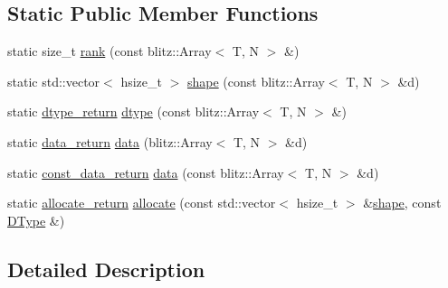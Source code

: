 \subsection*{Static Public Member Functions}
\begin{DoxyCompactItemize}
\item 
static size\-\_\-t \hyperlink{struct_h5_t_l_1_1adapt_3_01blitz_1_1_array_3_01_t_00_01_n_01_4_01_4_aa7b8bfd6f390e5f38d1fc1fc775e3809}{rank} (const blitz\-::\-Array$<$ T, N $>$ \&)
\item 
static std\-::vector$<$ hsize\-\_\-t $>$ \hyperlink{struct_h5_t_l_1_1adapt_3_01blitz_1_1_array_3_01_t_00_01_n_01_4_01_4_aa16aa3ace38b511e9753768cc59ba990}{shape} (const blitz\-::\-Array$<$ T, N $>$ \&d)
\item 
static \hyperlink{struct_h5_t_l_1_1adapt_3_01blitz_1_1_array_3_01_t_00_01_n_01_4_01_4_af2875af95d8e3b980fcf97ce74363f52}{dtype\-\_\-return} \hyperlink{struct_h5_t_l_1_1adapt_3_01blitz_1_1_array_3_01_t_00_01_n_01_4_01_4_af2687430b3ee40d33f9bbb12274f4c12}{dtype} (const blitz\-::\-Array$<$ T, N $>$ \&)
\item 
static \hyperlink{struct_h5_t_l_1_1adapt_3_01blitz_1_1_array_3_01_t_00_01_n_01_4_01_4_a0e4d35a2e0a1c22042107b22afea18a4}{data\-\_\-return} \hyperlink{struct_h5_t_l_1_1adapt_3_01blitz_1_1_array_3_01_t_00_01_n_01_4_01_4_add207e4e3cdf640268b6c280091ea325}{data} (blitz\-::\-Array$<$ T, N $>$ \&d)
\item 
static \hyperlink{struct_h5_t_l_1_1adapt_3_01blitz_1_1_array_3_01_t_00_01_n_01_4_01_4_add4a9236bffd7861aa0bb5972c78221f}{const\-\_\-data\-\_\-return} \hyperlink{struct_h5_t_l_1_1adapt_3_01blitz_1_1_array_3_01_t_00_01_n_01_4_01_4_ab7503647e1fdb2550fd47c66fea17b82}{data} (const blitz\-::\-Array$<$ T, N $>$ \&d)
\item 
static \hyperlink{struct_h5_t_l_1_1adapt_3_01blitz_1_1_array_3_01_t_00_01_n_01_4_01_4_a36fe01410b3795e22c6841dc5b616191}{allocate\-\_\-return} \hyperlink{struct_h5_t_l_1_1adapt_3_01blitz_1_1_array_3_01_t_00_01_n_01_4_01_4_a493237bd328544e9cbf6cb18e1f0bbd8}{allocate} (const std\-::vector$<$ hsize\-\_\-t $>$ \&\hyperlink{struct_h5_t_l_1_1adapt_3_01blitz_1_1_array_3_01_t_00_01_n_01_4_01_4_aa16aa3ace38b511e9753768cc59ba990}{shape}, const \hyperlink{class_h5_t_l_1_1_d_type}{D\-Type} \&)
\end{DoxyCompactItemize}


\subsection{Detailed Description}
